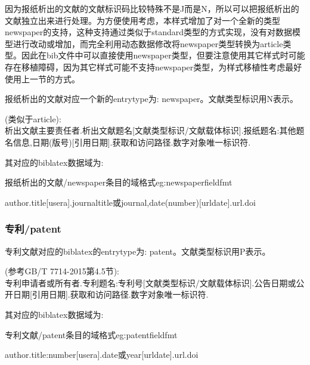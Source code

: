 因为报纸析出的文献的文献标识码比较特殊不是J而是N，所以可以把报纸析出的文献独立出来进行处理。为方便使用考虑，本样式增加了对一个全新的类型newspaper的支持，这种支持通过类似于standard类型的方式实现，没有对数据模型进行改动或增加，而完全利用动态数据修改将newspaper类型转换为article类型。因此在bib文件中可以直接使用newspaper类型，但要注意使用其它样式时可能存在移植障碍，因为其它样式可能不支持newspaper类型，为样式移植性考虑最好使用上一节的方式。

\begin{refentry}{}{}
报纸析出的文献对应一个新的entrytype为: newspaper。文献类型标识用N表示。

(类似于article):\\
析出文献主要责任者.析出文献题名[文献类型标识/文献载体标识].报纸题名:其他题名信息,日期(版号)[引用日期].获取和访问路径.数字对象唯一标识符.
\end{refentry}

其对应的biblatex数据域为:
\begin{example}{报纸析出的文献/newspaper条目的域格式}{eg:newspaperfieldfmt}
\begin{texlist}
author.title[usera].journaltitle或journal,date(number)[urldate].url.doi
\end{texlist}
\end{example}

\subsubsection{专利/patent}
\begin{refentry}{}{}%
专利文献对应的biblatex的entrytype为: patent。文献类型标识用P表示。

(参考GB/T 7714-2015第4.5节):\\
专利申请者或所有者.专利题名:专利号[文献类型标识/文献载体标识].公告日期或公开日期[引用日期].获取和访问路径.数字对象唯一标识符.
\end{refentry}

其对应的biblatex数据域为:
\begin{example}{专利文献/patent条目的域格式}{eg:patentfieldfmt}
\begin{texlist}
author.title:number[usera].date或year[urldate].url.doi
\end{texlist}
\end{example}


